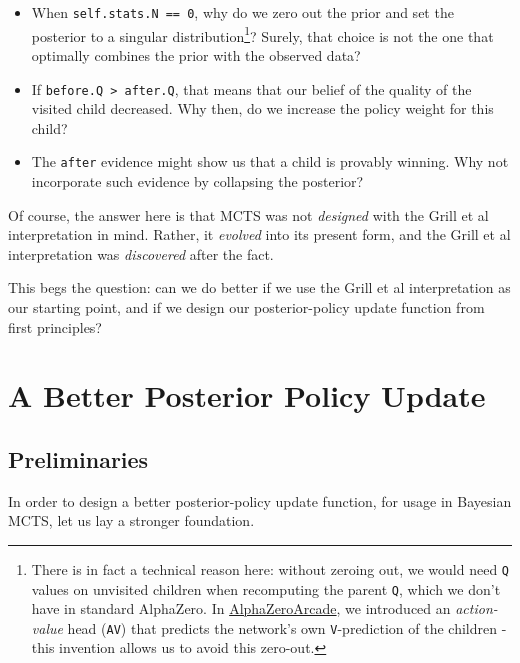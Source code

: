 \documentclass[tikz]{article}
\begin{document}
\begin{itemize}
    \item When \texttt{self.stats.N == 0}, why do we zero out the prior and set the posterior to a singular distribution\footnote{
    There is in fact a technical reason here: without zeroing out, we would need \texttt{Q} values on unvisited children when recomputing
    the parent \texttt{Q}, which we don't have in standard AlphaZero. In \href{https://github.com/shindavid/AlphaZeroArcade}{AlphaZeroArcade},
    we introduced an \emph{action-value} head (\texttt{AV}) that predicts the network's own \texttt{V}-prediction of the children - this invention
    allows us to avoid this zero-out.}?
    Surely, that choice is not the one that optimally combines the prior with the observed data?
    \item If \texttt{before.Q > after.Q}, that means that our belief of the quality of the visited child decreased. Why then, do we increase the policy weight for this child?
    \item The \texttt{after} evidence might show us that a child is provably winning. Why not incorporate such evidence by collapsing the posterior?
\end{itemize}

Of course, the answer here is that MCTS was not \textit{designed} with the Grill et al interpretation in mind. Rather, it \textit{evolved} into
its present form, and the Grill et al interpretation was \textit{discovered} after the fact. \newline

This begs the question: can we do better if we use the Grill et al interpretation as our starting point, and if we design our posterior-policy update
function from first principles?

\section{A Better Posterior Policy Update}

\subsection{Preliminaries}

In order to design a better posterior-policy update function, for usage in Bayesian MCTS, let us lay a stronger foundation. \newline
\end{document}
